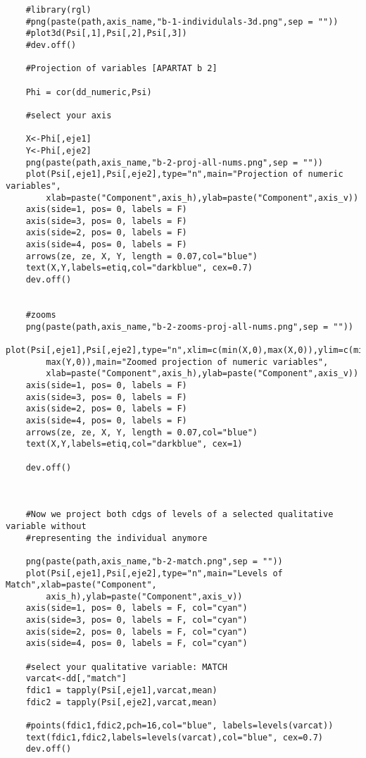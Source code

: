 \begin{verbatim}
    #library(rgl)
    #png(paste(path,axis_name,"b-1-individulals-3d.png",sep = ""))
    #plot3d(Psi[,1],Psi[,2],Psi[,3])
    #dev.off()
    
    #Projection of variables [APARTAT b 2]
    
    Phi = cor(dd_numeric,Psi)
    
    #select your axis
    
    X<-Phi[,eje1]
    Y<-Phi[,eje2]
    png(paste(path,axis_name,"b-2-proj-all-nums.png",sep = ""))
    plot(Psi[,eje1],Psi[,eje2],type="n",main="Projection of numeric variables",
        xlab=paste("Component",axis_h),ylab=paste("Component",axis_v))
    axis(side=1, pos= 0, labels = F)
    axis(side=3, pos= 0, labels = F)
    axis(side=2, pos= 0, labels = F)
    axis(side=4, pos= 0, labels = F)
    arrows(ze, ze, X, Y, length = 0.07,col="blue")
    text(X,Y,labels=etiq,col="darkblue", cex=0.7)
    dev.off()
    
    
    #zooms
    png(paste(path,axis_name,"b-2-zooms-proj-all-nums.png",sep = ""))
    plot(Psi[,eje1],Psi[,eje2],type="n",xlim=c(min(X,0),max(X,0)),ylim=c(min(Y,0),
        max(Y,0)),main="Zoomed projection of numeric variables",
        xlab=paste("Component",axis_h),ylab=paste("Component",axis_v))
    axis(side=1, pos= 0, labels = F)
    axis(side=3, pos= 0, labels = F)
    axis(side=2, pos= 0, labels = F)
    axis(side=4, pos= 0, labels = F)
    arrows(ze, ze, X, Y, length = 0.07,col="blue")
    text(X,Y,labels=etiq,col="darkblue", cex=1)

    dev.off()
    
    
    
    #Now we project both cdgs of levels of a selected qualitative variable without
    #representing the individual anymore
    
    png(paste(path,axis_name,"b-2-match.png",sep = ""))
    plot(Psi[,eje1],Psi[,eje2],type="n",main="Levels of Match",xlab=paste("Component",
        axis_h),ylab=paste("Component",axis_v))
    axis(side=1, pos= 0, labels = F, col="cyan")
    axis(side=3, pos= 0, labels = F, col="cyan")
    axis(side=2, pos= 0, labels = F, col="cyan")
    axis(side=4, pos= 0, labels = F, col="cyan")
    
    #select your qualitative variable: MATCH
    varcat<-dd[,"match"]
    fdic1 = tapply(Psi[,eje1],varcat,mean)
    fdic2 = tapply(Psi[,eje2],varcat,mean)
    
    #points(fdic1,fdic2,pch=16,col="blue", labels=levels(varcat))
    text(fdic1,fdic2,labels=levels(varcat),col="blue", cex=0.7)
    dev.off()
    

\end{verbatim}
